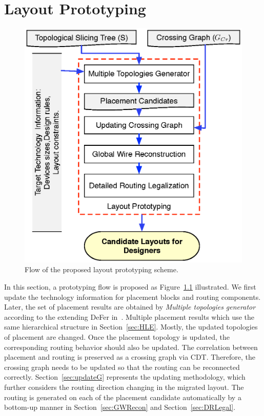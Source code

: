 \chapter{Layout Prototyping}\label{chap:prototyping}

  \begin{figure}[t]
    \centering
    \includegraphics[height=\textwidth]{Fig/proto_flow.eps}
    \caption{Flow of the proposed layout prototyping scheme.} 
    \label{fig:Proto_Flow}
  \end{figure}

  In this section, a prototyping flow is proposed as Figure~\ref{fig:Proto_Flow} illustrated. We first update the technology information for placement blocks and routing components. Later, the set of placement results are obtained by \textit{Multiple topologies generator} according to the extending DeFer in~\cite{ALP_YPWeng_iccad2011}. Multiple placement results which use the same hierarchical structure in Section~\ref{sec:HLE}. Mostly, the updated topologies of placement are changed. Once the placement topology is updated, the corresponding routing behavior should also be updated. The correlation between placement and routing is preserved as a crossing graph via CDT. Therefore, the crossing graph needs to be updated so that the routing can be reconnected correctly. Section~\ref{sec:updateG} represents the updating methodology, which further considers the routing direction changing in the migrated layout. The routing is generated on each of the placement candidate automatically by a bottom-up manner in Section~\ref{sec:GWRecon} and Section~\ref{sec:DRLegal}. 


